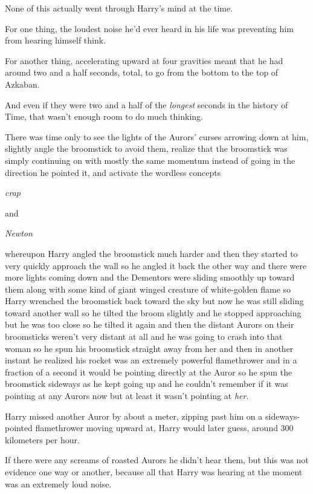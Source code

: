 None of this actually went through Harry's mind at the time.

For one thing, the loudest noise he'd ever heard in his life was preventing him from hearing himself think.

For another thing, accelerating upward at four gravities meant that he had around two and a half seconds, total, to go from the bottom to the top of Azkaban.

And even if they were two and a half of the \emph{longest} seconds in the history of Time, that wasn't enough room to do much thinking.

There was time only to see the lights of the Aurors' curses arrowing down at him, slightly angle the broomstick to avoid them, realize that the broomstick was simply continuing on with mostly the same momentum instead of going in the direction he pointed it, and activate the wordless concepts

\emph{crap}

and

\emph{Newton}

whereupon Harry angled the broomstick much harder and then they started to very quickly approach the wall so he angled it back the other way and there were more lights coming down and the Dementors were sliding smoothly up toward them along with some kind of giant winged creature of white-golden flame so Harry wrenched the broomstick back toward the sky but now he was still sliding toward another wall so he tilted the broom slightly and he stopped approaching but he was too close so he tilted it again and then the distant Aurors on their broomsticks weren't very distant at all and he was going to crash into that woman so he spun his broomstick straight away from her and then in another instant he realized his rocket was an extremely powerful flamethrower and in a fraction of a second it would be pointing directly at the Auror so he spun the broomstick sideways as he kept going up and he couldn't remember if it was pointing at any Aurors now but at least it wasn't pointing at \emph{her}.

Harry missed another Auror by about a meter, zipping past him on a sideways-pointed flamethrower moving upward at, Harry would later guess, around 300 kilometers per hour.

If there were any screams of roasted Aurors he didn't hear them, but this was not evidence one way or another, because all that Harry was hearing at the moment was an extremely loud noise.

